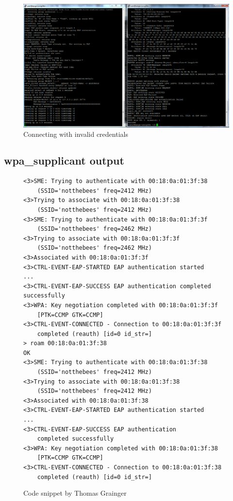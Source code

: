 \documentclass[12pt,a4paper,titlepage]{article}
\begin{document}
\begin{figure}[h!]
\centering
\includegraphics[scale=0.3]{./images/simulation/test3.png}
\caption{Connecting with invalid credentials}
\end{figure}

\subsection{wpa\_supplicant output}
\label{sec:testing-output;sub:supplicant}
\begin{figure}[h!]
\begin{Verbatim}[frame=single]
<3>SME: Trying to authenticate with 00:18:0a:01:3f:38
	(SSID='notthebees' freq=2412 MHz)
<3>Trying to associate with 00:18:0a:01:3f:38
	(SSID='notthebees' freq=2412 MHz)
<3>SME: Trying to authenticate with 00:18:0a:01:3f:3f
	(SSID='notthebees' freq=2462 MHz)
<3>Trying to associate with 00:18:0a:01:3f:3f
	(SSID='notthebees' freq=2462 MHz)
<3>Associated with 00:18:0a:01:3f:3f
<3>CTRL-EVENT-EAP-STARTED EAP authentication started
...
<3>CTRL-EVENT-EAP-SUCCESS EAP authentication completed successfully
<3>WPA: Key negotiation completed with 00:18:0a:01:3f:3f
	[PTK=CCMP GTK=CCMP]
<3>CTRL-EVENT-CONNECTED - Connection to 00:18:0a:01:3f:3f
	completed (reauth) [id=0 id_str=]
> roam 00:18:0a:01:3f:38
OK
<3>SME: Trying to authenticate with 00:18:0a:01:3f:38
	(SSID='notthebees' freq=2412 MHz)
<3>Trying to associate with 00:18:0a:01:3f:38
	(SSID='notthebees' freq=2412 MHz)
<3>Associated with 00:18:0a:01:3f:38
<3>CTRL-EVENT-EAP-STARTED EAP authentication started
...
<3>CTRL-EVENT-EAP-SUCCESS EAP authentication
	completed successfully
<3>WPA: Key negotiation completed with 00:18:0a:01:3f:38
	[PTK=CCMP GTK=CCMP]
<3>CTRL-EVENT-CONNECTED - Connection to 00:18:0a:01:3f:38
	completed (reauth) [id=0 id_str=]
\end{Verbatim}
\caption{Code snippet by Thomas Grainger}
\end{figure}
\end{document}
